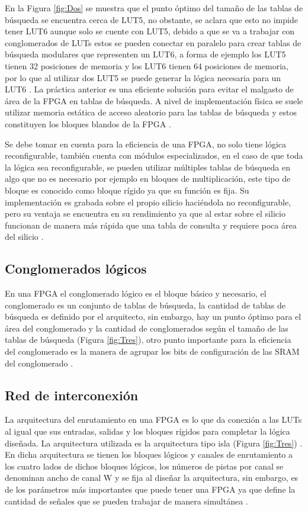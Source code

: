 En la Figura \ref{fig:Dos} se muestra que el punto óptimo del tamaño de las tablas de búsqueda se encuentra cerca de LUT5, no obstante, se aclara que esto no impide tener LUT6 aunque solo se cuente con LUT5, debido a que se va a trabajar con conglomerados de LUTs estos se pueden conectar en paralelo para crear tablas de búsqueda modulares que representen un LUT6, a forma de ejemplo los LUT5 tienen 32 posiciones de memoria y los LUT6 tienen 64 posiciones de memoria, por lo que al utilizar dos LUT5 se puede generar la lógica necesaria para un LUT6 \cite{kuon2008fpga}. La práctica anterior es una eficiente solución para evitar el malgasto de área de la FPGA en tablas de búsqueda. A nivel de implementación física se suele utilizar memoria estática de acceso aleatorio para las tablas de búsqueda y estos constituyen los bloques blandos de la FPGA \cite{kuon2008fpga}.

Se debe tomar en cuenta para la eficiencia de una FPGA, no solo tiene lógica reconfigurable, también cuenta con módulos especializados, en el caso de que toda la lógica sea reconfigurable, se pueden utilizar múltiples tablas de búsqueda en algo que no es necesario por ejemplo en bloques de multiplicación, este tipo de bloque es conocido como bloque rígido ya que su función es fija. Su implementación es grabada sobre el propio silicio haciéndola no reconfigurable, pero su ventaja se encuentra en su rendimiento ya que al estar sobre el silicio funcionan de manera más rápida que una tabla de consulta y requiere poca área del silicio \cite{kuon2008fpga}.

\subsection{Conglomerados lógicos}
En una FPGA el conglomerado lógico es el bloque básico y necesario, el conglomerado es un conjunto de tablas de búsqueda, la cantidad de tablas de búsqueda es definido por el arquitecto, sin embargo, hay un punto óptimo para el área del conglomerado y la cantidad de conglomerados según el tamaño de las tablas de búsqueda (Figura \ref{fig:Tres}), otro punto importante para la eficiencia del conglomerado es la manera de agrupar los bits de configuración de las SRAM del conglomerado \cite{F_kuon2005}.

\subsection{Red de interconexión} 
 La arquitectura del enrutamiento en una FPGA es lo que da conexión a las LUTs al igual que sus entradas, salidas y los bloques rígidos para completar la lógica diseñada. La arquitectura utilizada es la arquitectura tipo isla (Figura \ref{fig:Tres}) \cite{hassani2024efficient, kuon2008fpga, A_oliver2007}. En dicha arquitectura se tienen los bloques lógicos y canales de enrutamiento a los cuatro lados de dichos bloques lógicos, los números de pistas por canal se denominan ancho de canal W y se fija al diseñar la arquitectura, sin embargo, es de los parámetros más importantes que puede tener una FPGA ya que define la cantidad de señales que se pueden trabajar de manera simultánea \cite{hassani2024efficient, kuon2008fpga}.

